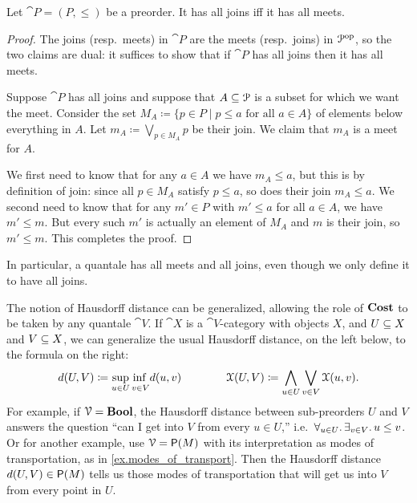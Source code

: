 \documentclass[7Sketches]{subfiles}
\begin{document}
\begin{proposition}
Let $\cat{P}=(P,\leq)$ be a preorder. It has all joins iff it has all meets.
\end{proposition}%
\begin{proof}
The joins (resp.\ meets) in $\cat{P}$ are the meets (resp.\ joins) in $\cat{P}\op$, so the two claims are dual: it suffices to show that if $\cat{P}$ has all joins then it has all meets.

Suppose $\cat{P}$ has all joins and suppose that $A\ss\cat{P}$ is a subset for which we want the meet. Consider the set $M_A\coloneqq\{p\in P\mid p\leq a\text{ for all }a\in A\}$ of elements below everything in $A$. Let $m_A\coloneqq\bigvee_{p\in M_A}p$ be their join. We claim that $m_A$ is a meet for $A$.

We first need to know that for any $a\in A$ we have $m_A\leq a$, but this is by definition of join: since all $p\in M_A$ satisfy $p\leq a$, so does their join $m_A\leq a$. We second need to know that for any $m'\in P$ with $m'\leq a$ for all $a\in A$, we have $m'\leq m$. But every such $m'$ is actually an element of $M_A$ and $m$ is their join, so $m'\leq m$. This completes the proof.
\end{proof}

In particular, a quantale has all meets and all joins, even though we only define it to have all joins.

\begin{remark}
%
The notion of Hausdorff distance can be generalized, allowing the role of $\Cost$ to be taken by
any quantale $\cat{V}$. If $\cat{X}$ is a $\cat{V}$-category with objects $X$, and $U\ss X$
and $V\ss X$, we can generalize the usual Hausdorff distance, on the left
below, to the formula on the right:
\[
  d(U,V)\coloneqq\sup_{u\in U}\underset{v \in V}{\inf\vphantom{p}}d(u,v)
  \qquad\qquad
  \cat{X}(U,V)\coloneqq\bigwedge_{u\in U}\bigvee_{v\in V}\cat{X}(u,v).
\]
For example, if $\cat{V}=\Bool$, the Hausdorff distance between sub-preorders
$U$ and $V$ answers the question ``can I get into $V$ from every $u\in U$,''
i.e.\ $\forall_{u\in U}\ldotp\exists_{v\in V}\ldotp u\leq v$. Or for another example,
use $\cat{V}=\powset(M)$ with its interpretation as modes of transportation, as
in \cref{ex.modes_of_transport}. Then the Hausdorff distance
$d(U,V)\in\powset(M)$ tells us those modes of transportation that will get us
into $V$ from every point in $U$.
\end{remark}
\end{document}
